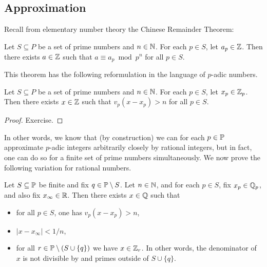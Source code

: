 \documentclass[12pt, leqno, british]{amsart}
\begin{document}
\subsection{Approximation}
Recall from elementary number theory the Chinese Remainder Theorem:
\begin{thm}\label{T:CRT}
Let $S \subseteq P$ be a set of prime numbers and $n \in \mathbb N$.
For each $p \in S$, let $a_p \in \mathbb Z$.
Then there exists $a \in \mathbb Z$ such that $a \equiv a_p \bmod p^n$ for all $p \in S$.
\end{thm}
This theorem has the following reformulation in the language of $p$-adic numbers.
\begin{cor}\label{C:CRT}
Let $S \subseteq P$ be a set of prime numbers and $n \in \mathbb N$.
For each $p \in S$, let $x_p \in \mathbb Z_p$.
Then there exists $x \in \mathbb Z$ such that $v_p(x - x_p) > n$ for all $p \in S$.
\end{cor}
\begin{proof}
Exercise.
\end{proof}
In other words, we know that (by construction) we can for each $p \in \mathbb P$ approximate $p$-adic integers arbitrarily closely by rational integers, but in fact, one can do so for a finite set of prime numbers simultaneously.
We now prove the following variation for rational numbers.
\begin{thm}\label{T:WAT}
Let $S \subseteq \mathbb P$ be finite and fix $q \in \mathbb P \setminus S$.
Let $n \in \mathbb N$, and for each $p \in S$, fix $x_p \in \mathbb Q_p$, and also fix $x_\infty \in \mathbb R$.
Then there exists $x \in \mathbb Q$ such that
\begin{itemize}
\item for all $p \in S$, one has $v_p(x - x_p) > n$,
\item $\lvert x - x_\infty \rvert < 1/n$,
\item for all $r \in \mathbb P \setminus (S \cup \lbrace q \rbrace)$ we have $x \in \mathbb Z_r$.
In other words, the denominator of $x$ is not divisible by and primes outside of $S \cup \lbrace q \rbrace$.
\end{itemize} 
\end{thm}
\end{document}
